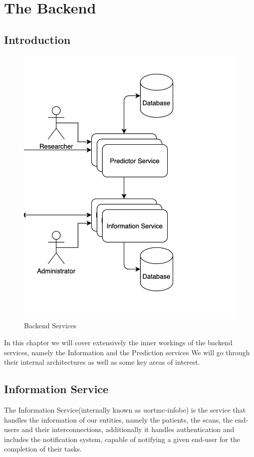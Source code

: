 \chapter{The Backend}
\label{backend}
	\section{Introduction}
		\begin{figure}[H]
			\iftrue
			\caption{Backend Services}
			\centering
			\includegraphics[scale=0.5]{figures/backend}
			\fi
		\end{figure}
		In this chapter we will cover extensively the inner workings of the backend services, namely the Information and the Prediction services
		We will go through their internal architectures as well as some key areas of interest.
	\section{Information Service}
		The Information Service(internally known as uortmc-infobe) is the service that handles the information of our entities, namely the
		patients, the scans, the end-users and their interconnections, additionally it handles authentication and includes the notification
		system, capable of notifying a given end-user for the completion of their tasks.\par

